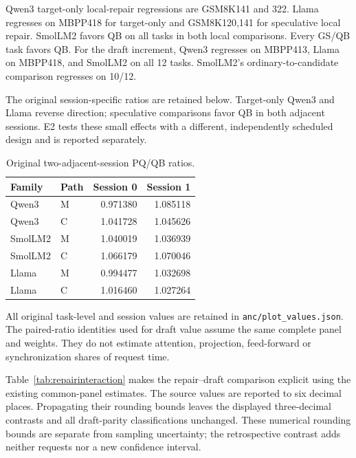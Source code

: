 Qwen3 target-only local-repair regressions are GSM8K141 and 322. Llama regresses on MBPP418 for target-only and GSM8K120,141 for speculative local repair. SmolLM2 favors QB on all tasks in both local comparisons. Every GS/QB task favors QB. For the draft increment, Qwen3 regresses on MBPP413, Llama on MBPP418, and SmolLM2 on all 12 tasks. SmolLM2's ordinary-to-candidate comparison regresses on 10/12.

The original session-specific ratios are retained below. Target-only Qwen3 and Llama reverse direction; speculative comparisons favor QB in both adjacent sessions. E2 tests these small effects with a different, independently scheduled design and is reported separately.
\begin{table}[t]\centering\small
\caption{Original two-adjacent-session PQ/QB ratios.}\label{tab:oldsessions}
\begin{tabular}{llrr}\toprule
Family & Path & Session 0 & Session 1\\\midrule
Qwen3&M&0.971380&1.085118\\
Qwen3&C&1.041728&1.045626\\
SmolLM2&M&1.040019&1.036939\\
SmolLM2&C&1.066179&1.070046\\
Llama&M&0.994477&1.032698\\
Llama&C&1.016460&1.027264\\
\bottomrule\end{tabular}\end{table}
All original task-level and session values are retained in \texttt{anc/plot\_values.json}. The paired-ratio identities used for draft value assume the same complete panel and weights. They do not estimate attention, projection, feed-forward or synchronization shares of request time.



Table~\ref{tab:repairinteraction} makes the repair--draft comparison explicit using the existing common-panel estimates. The source values are reported to six decimal places. Propagating their rounding bounds leaves the displayed three-decimal contrasts and all draft-parity classifications unchanged. These numerical rounding bounds are separate from sampling uncertainty; the retrospective contrast adds neither requests nor a new confidence interval.

